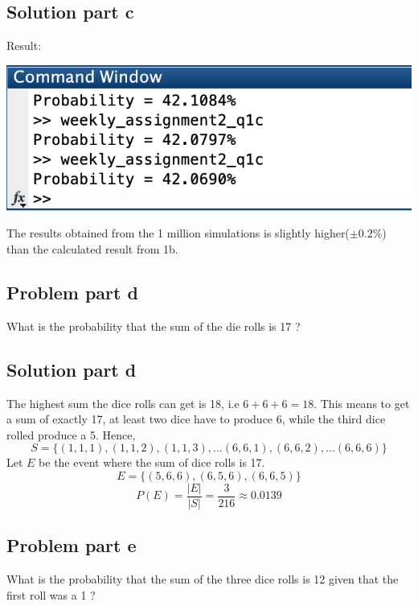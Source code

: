 \documentclass[12pt]{article}%
\newcommand\abs[1]{\left|#1\right|}
\begin{document}
\subsection*{Solution part c}
 
Result: \\
\begin{center}
\includegraphics[scale=0.8]{q1c_result} \\
\end{center} 
The results obtained from the 1 million simulations is slightly higher($\pm0.2\%$) than the calculated result from 1b.
\newpage
\subsection*{Problem part d}
What is the probability that the sum of the die rolls is 17 ?
\subsection*{Solution part d}
The highest sum the dice rolls can get is 18, i.e \begin{math}6+6+6=18\end{math}. This means to get a sum of exactly 17, at least two dice have to produce 6, while the third dice rolled produce a 5. Hence,
\begin{equation*}
S=\{(1,1,1), (1,1,2),  (1,1,3), ... (6,6,1), (6,6,2), ...(6,6,6)\} 
\end{equation*} 
Let $E$ be the event where the sum of dice rolls is 17.
\begin{equation*}
E=\{(5,6,6),(6,5,6),(6,6,5)\}
\end{equation*}
\begin{equation*}
P(E)= \frac{\abs{E}}{\abs{S}} = \frac{3}{216} \approx 0.0139
\end{equation*}

\subsection*{Problem part e}
What is the probability that the sum of the three dice rolls is 12 given that the first roll was a 1 ?
\end{document}
